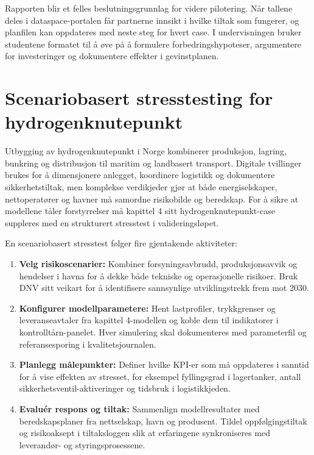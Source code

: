 Rapporten blir et felles beslutningsgrunnlag for videre pilotering. Når tallene deles i dataspace-portalen får partnerne innsikt i hvilke tiltak som fungerer, og planfilen kan oppdateres med neste steg for hvert case. I undervisningen bruker studentene formatet til å øve på å formulere forbedringshypoteser, argumentere for investeringer og dokumentere effekter i gevinstplanen.

\section{Scenariobasert stresstesting for hydrogenknutepunkt}
Utbygging av hydrogenknutepunkt i Norge kombinerer produksjon, lagring, bunkring og distribusjon til maritim og landbasert transport.\citep{enova2024hydrogenknutepunkt} Digitale tvillinger brukes for å dimensjonere anlegget, koordinere logistikk og dokumentere sikkerhetstiltak, men komplekse verdikjeder gjør at både energiselskaper, nettoperatører og havner må samordne risikobilde og beredskap.\citep{gassco2023hydrogen,dnv2023hydrogenforecast} For å sikre at modellene tåler forstyrrelser må kapittel 4 sitt hydrogenknutepunkt-case suppleres med en strukturert stresstest i valideringsløpet.

En scenariobasert stresstest følger fire gjentakende aktiviteter:
\begin{enumerate}
    \item \textbf{Velg risikoscenarier:} Kombiner forsyningsavbrudd, produksjonsavvik og hendelser i havna for å dekke både tekniske og operasjonelle risikoer. Bruk DNV sitt veikart for å identifisere sannsynlige utviklingstrekk frem mot 2030.\citep{dnv2023hydrogenforecast}
    \item \textbf{Konfigurer modellparametere:} Hent lastprofiler, trykkgrenser og leveranseavtaler fra kapittel 4-modellen og koble dem til indikatorer i kontrolltårn-panelet. Hver simulering skal dokumenteres med parameterfil og referansesporing i kvalitetsjournalen.
    \item \textbf{Planlegg målepunkter:} Definer hvilke KPI-er som må oppdateres i sanntid for å vise effekten av stresset, for eksempel fyllingsgrad i lagertanker, antall sikkerhetsventil-aktiveringer og tidsbruk i logistikkjeden.
    \item \textbf{Evaluér respons og tiltak:} Sammenlign modellresultater med beredskapsplaner fra nettselskap, havn og produsent. Tildel oppfølgingstiltak og risikoaksept i tiltaksloggen slik at erfaringene synkroniseres med leverandør- og styringsprosessene.
\end{enumerate}

